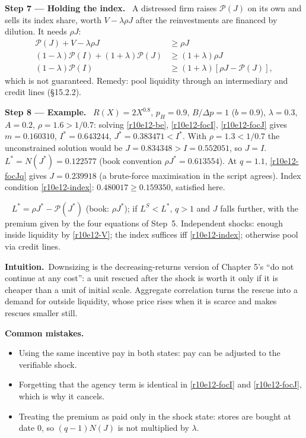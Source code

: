 \documentclass[11pt,a4paper]{article}
\newcommand{\step}[2]{\par\medskip\noindent\textbf{Step #1 --- #2.}~}
\newcommand{\intuition}{\par\medskip\noindent\textbf{Intuition.}~}
\newcommand{\answer}[1]{\par\smallskip\noindent\fbox{\textbf{Answer\if\relax\detokenize{#1}\relax\else\ #1\fi.}}~}
\newcommand{\pitfalls}{\par\medskip\noindent\textbf{Common mistakes.}}
\newcommand{\Pc}{\mathcal{P}}
\begin{document}
\step{7}{Holding the index} A distressed firm raises $\Pc(J)$ on its own and sells its index share, worth $V-\lambda\rho J$ after the reinvestments are financed by dilution. It needs $\rho J$:
\begin{align}
  \Pc(J)+V-\lambda\rho J &\geq \rho J \nonumber\\
  (1-\lambda)\Pc(I)+(1+\lambda)\Pc(J) &\geq (1+\lambda)\rho J \nonumber\\
  (1-\lambda)\Pc(I) &\geq (1+\lambda)[\rho J-\Pc(J)], \label{r10e12-index}
\end{align}
which is not guaranteed. Remedy: pool liquidity through an intermediary and credit lines (\S15.2.2).

\step{8}{Example} $R(X)=2X^{0.8}$, $p_H=0.9$, $B/\Delta p=1$ ($b=0.9$), $\lambda=0.3$, $A=0.2$, $\rho=1.6>1/0.7$: solving \eqref{r10e12-be}, \eqref{r10e12-focI}, \eqref{r10e12-focJ} gives $m=0.160310$, $I^*=0.643244$, $J^*=0.383471<I^*$. With $\rho=1.3<1/0.7$ the unconstrained solution would be $J=0.834348>I=0.552051$, so $J=I$. $L^*=N(J^*)=0.122577$ (book convention $\rho J^*=0.613554$). At $q=1.1$, \eqref{r10e12-focJq} gives $J=0.239918$ (a brute-force maximisation in the script agrees). Index condition \eqref{r10e12-index}: $0.480017\geq0.159350$, satisfied here.

\answer{(ii)--(iii)} $L^*=\rho J^*-\Pc(J^*)$ (book: $\rho J^*$); if $L^S<L^*$, $q>1$ and $J$ falls further, with the premium given by the four equations of Step~5. Independent shocks: enough inside liquidity by \eqref{r10e12-V}; the index suffices iff \eqref{r10e12-index}; otherwise pool via credit lines.

\intuition Downsizing is the decreasing-returns version of Chapter 5's ``do not continue at any cost'': a unit rescued after the shock is worth it only if it is cheaper than a unit of initial scale. Aggregate correlation turns the rescue into a demand for outside liquidity, whose price rises when it is scarce and makes rescues smaller still.

\pitfalls
\begin{itemize}
  \item Using the same incentive pay in both states: pay can be adjusted to the verifiable shock.
  \item Forgetting that the agency term is identical in \eqref{r10e12-focI} and \eqref{r10e12-focJ}, which is why it cancels.
  \item Treating the premium as paid only in the shock state: stores are bought at date 0, so $(q-1)N(J)$ is not multiplied by $\lambda$.
\end{itemize}
\end{document}
